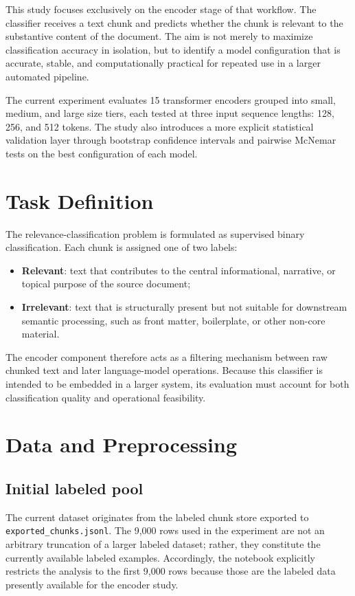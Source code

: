 \documentclass[11pt]{article}
\begin{document}
This study focuses exclusively on the encoder stage of that workflow. The classifier receives a text chunk and predicts whether the chunk is relevant to the substantive content of the document. The aim is not merely to maximize classification accuracy in isolation, but to identify a model configuration that is accurate, stable, and computationally practical for repeated use in a larger automated pipeline.

The current experiment evaluates 15 transformer encoders grouped into small, medium, and large size tiers, each tested at three input sequence lengths: 128, 256, and 512 tokens. The study also introduces a more explicit statistical validation layer through bootstrap confidence intervals and pairwise McNemar tests on the best configuration of each model.

\section{Task Definition}

The relevance-classification problem is formulated as supervised binary classification. Each chunk is assigned one of two labels:
\begin{itemize}
    \item \textbf{Relevant}: text that contributes to the central informational, narrative, or topical purpose of the source document;
    \item \textbf{Irrelevant}: text that is structurally present but not suitable for downstream semantic processing, such as front matter, boilerplate, or other non-core material.
\end{itemize}

The encoder component therefore acts as a filtering mechanism between raw chunked text and later language-model operations. Because this classifier is intended to be embedded in a larger system, its evaluation must account for both classification quality and operational feasibility.

\section{Data and Preprocessing}

\subsection{Initial labeled pool}

The current dataset originates from the labeled chunk store exported to \texttt{exported\_chunks.jsonl}. The 9{,}000 rows used in the experiment are not an arbitrary truncation of a larger labeled dataset; rather, they constitute the currently available labeled examples. Accordingly, the notebook explicitly restricts the analysis to the first 9{,}000 rows because those are the labeled data presently available for the encoder study.
\end{document}
